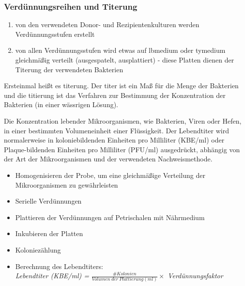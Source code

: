 \subsubsection{Verdünnungsreihen und Titerung}
\begin{enumerate}
    \item von den verwendeten Donor- und Rezipientenkulturen werden Verdünnungsstufen erstellt
    \item von allen Verdünnungsstufen wird etwas auf \gls{lbmedium} oder \gls{tymedium} gleichmäßig verteilt (ausgespatelt, ausplattiert) - diese Platten dienen der Titerung der verwendeten Bakterien
\end{enumerate}
\begin{mybox}[title=Was ist Titierung?]
Ersteinmal heißt es \gls{titerung}.  Der \gls{titer} ist ein Maß für die Menge der Bakterien und die \gls{titierung} ist das Verfahren zur Bestimmung der Konzentration der Bakterien (in einer wässrigen Lösung). 
\end{mybox} 



\begin{mechanism}[title=Definition Lebendtiter]
Die Konzentration lebender Mikroorganismen, wie Bakterien, Viren oder Hefen, in einer bestimmten Volumeneinheit einer Flüssigkeit. Der Lebendtiter wird normalerweise in koloniebildenden Einheiten pro Milliliter (KBE/ml) oder Plaque-bildenden Einheiten pro Milliliter (PFU/ml) ausgedrückt, abhängig von der Art der Mikroorganismen und der verwendeten Nachweismethode. 
\end{mechanism}
 
 
  
 
\begin{mechanism}[title=Wie bestimmt man einen Lebendtiter? ausführlich]
\begin{itemize}
    \item Homogenisieren der Probe, um eine gleichmäßige Verteilung der Mikroorganismen zu gewährleisten
    \item Serielle Verdünnungen
    \item Plattieren der Verdünnungen auf Petrischalen mit Nährmedium
    \item Inkubieren der Platten
    \item Koloniezählung
    \item Berechnung des Lebendtiters: \\ 
    \textit{Lebendtiter (KBE/ml) = }$\frac{\# Kolonien}{Volumen \ der \ Plattierung (ml)} \times$ \textit{Verdünnungsfaktor}
\end{itemize}
\end{mechanism}





